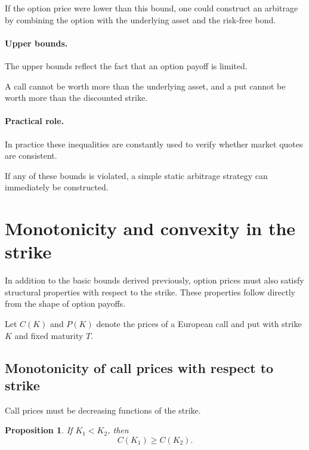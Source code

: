 \documentclass[11pt]{article}
\newcommand{\1}{\mathbf{1}}
\theoremstyle{plain}
\newtheorem{proposition}[theorem]{Proposition}
\theoremstyle{definition}
\theoremstyle{remark}
\begin{document}
If the option price were lower than this bound, one could construct
an arbitrage by combining the option with the underlying asset
and the risk-free bond.

\paragraph{Upper bounds.}

The upper bounds reflect the fact that an option payoff is limited.

A call cannot be worth more than the underlying asset,
and a put cannot be worth more than the discounted strike.

\paragraph{Practical role.}

In practice these inequalities are constantly used to verify
whether market quotes are consistent.

If any of these bounds is violated, a simple static arbitrage
strategy can immediately be constructed.
\section{Monotonicity and convexity in the strike}

In addition to the basic bounds derived previously, option prices must
also satisfy structural properties with respect to the strike.
These properties follow directly from the shape of option payoffs.

Let \(C(K)\) and \(P(K)\) denote the prices of a European call and put
with strike \(K\) and fixed maturity \(T\).

\subsection{Monotonicity of call prices with respect to strike}

Call prices must be decreasing functions of the strike.

\begin{proposition}
If \(K_1 < K_2\), then
\[
C(K_1) \ge C(K_2).
\]
\end{proposition}
\end{document}
